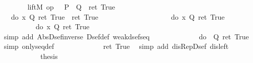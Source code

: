 \begin{isabellebody}
\ \ \ \ \isamarkupfalse%
\ {\isachardoublequote}{\isasymDown}\ {\isacharparenleft}{\isasymUp}\ {\isacharparenleft}liftM{}\ op\ {\isasymor}\ {\isacharparenleft}{\isasymDown}\ P{\isacharparenright}\ {\isacharparenleft}{\isasymDown}\ Q{\isacharparenright}{\isacharparenright}{\isacharparenright}\ {\isacharequal}\ ret\ True{\isachardoublequote}\isanewline
\ \ \ \ \isamarkupfalse%
\ {\isacharminus}\isanewline
\ \ \ \ \ \ \isamarkupfalse%
\ {\isachardoublequote}{\isasymDown}\ {\isacharparenleft}{\isasymUp}\ {\isacharparenleft}do\ {\isacharbraceleft}x{\isasymleftarrow}{\isasymDown}\ Q{\isacharsemicolon}\ ret\ True{\isacharbraceright}{\isacharparenright}{\isacharparenright}\ {\isacharequal}\ ret\ True{\isachardoublequote}\isanewline
\ \ \ \ \ \ \isamarkupfalse%
\ {\isacharminus}\isanewline
\ \ \ \ \ \ \ \ \isamarkupfalse%
\ {\isachardoublequote}{\isasymDown}\ {\isacharparenleft}{\isasymUp}\ {\isacharparenleft}do\ {\isacharbraceleft}x{\isasymleftarrow}{\isasymDown}\ Q{\isacharsemicolon}\ ret\ True{\isacharbraceright}{\isacharparenright}{\isacharparenright}\ {\isacharequal}\ \isanewline
\ \ \ \ \ \ \ \ \ \ do\ {\isacharbraceleft}x{\isasymleftarrow}{\isasymDown}\ Q{\isacharsemicolon}\ ret\ True{\isacharbraceright}{\isachardoublequote}\isanewline
\ \ \ \ \ \ \ \ \ \ \isamarkupfalse%
\ {\isacharparenleft}simp\ add{\isacharcolon}\ Abs{\isacharunderscore}Dsef{\isacharunderscore}inverse\ Dsef{\isacharunderscore}def\ weak{\isacharunderscore}dsef{\isacharunderscore}seq{\isacharparenright}\isanewline
\ \ \ \ \ \ \ \ \isamarkupfalse%
\ \isamarkupfalse%
\ {\isachardoublequote}{\isasymdots}\ {\isacharequal}\ do\ {\isacharbraceleft}{\isasymDown}\ Q{\isacharsemicolon}\ ret\ True{\isacharbraceright}{\isachardoublequote}\ \isamarkupfalse%
\ {\isacharparenleft}simp\ only{\isacharcolon}seq{\isacharunderscore}def{\isacharparenright}\isanewline
\ \ \ \ \ \ \ \ \isamarkupfalse%
\ \isamarkupfalse%
\ {\isachardoublequote}{\isasymdots}\ {\isacharequal}\ ret\ True{\isachardoublequote}\ \isamarkupfalse%
\ {\isacharparenleft}simp\ add{\isacharcolon}\ dis{\isacharunderscore}Rep{\isacharunderscore}Dsef\ dis{\isacharunderscore}left{\isacharparenright}\isanewline
\ \ \ \ \ \ \ \ \isamarkupfalse%
\ \isamarkupfalse%
\ {\isacharquery}thesis\ \isamarkupfalse%
\isacommand{{\isachardot}}\isanewline
\ \ \ \ \ \ \isamarkupfalse%
\isanewline
\ \ \ \ \ \ \isamarkupfalse%

\end{isabellebody}
